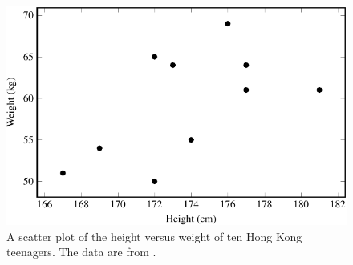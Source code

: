 \documentclass[a4paper,oneside,12pt]{article}
\begin{document}
\begin{figure}[!htbp]
\centering
\includegraphics[scale=1.1]{image/07/height-weight-scatterplot.pdf}
\caption{%
  A scatter plot of the height versus weight of ten Hong Kong
  teenagers.  The data are from .
}
\label{fig:height_weight_scatterplot}
\end{figure}

\begin{table}[!htbp]
\centering

\caption{%
  The number of hours that eleven students spent on studying for a
  test versus their test scores.  The test is marked out of ten.
}
\label{tab:test_score}
\end{table}
\end{document}

